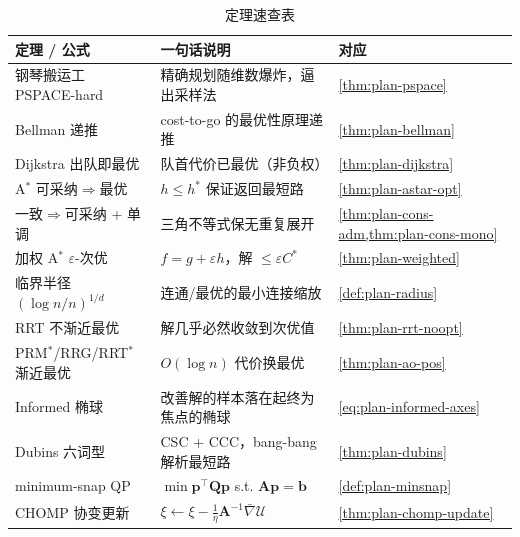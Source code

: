 \begin{table}[H]\centering\small
\caption{定理速查表}
\begin{tabular}{lll}
\toprule
定理 / 公式 & 一句话说明 & 对应 \\
\midrule
钢琴搬运工 PSPACE-hard & 精确规划随维数爆炸，逼出采样法 & \cref{thm:plan-pspace} \\
Bellman 递推 & cost-to-go 的最优性原理递推 & \cref{thm:plan-bellman} \\
Dijkstra 出队即最优 & 队首代价已最优（非负权） & \cref{thm:plan-dijkstra} \\
A$^*$ 可采纳$\Rightarrow$最优 & $h\le h^*$ 保证返回最短路 & \cref{thm:plan-astar-opt} \\
一致$\Rightarrow$可采纳 + 单调 & 三角不等式保无重复展开 & \cref{thm:plan-cons-adm,thm:plan-cons-mono} \\
加权 A$^*$ $\varepsilon$-次优 & $f=g+\varepsilon h$，解 $\le\varepsilon C^*$ & \cref{thm:plan-weighted} \\
临界半径 $(\log n/n)^{1/d}$ & 连通/最优的最小连接缩放 & \cref{def:plan-radius} \\
RRT 不渐近最优 & 解几乎必然收敛到次优值 & \cref{thm:plan-rrt-noopt} \\
PRM$^*$/RRG/RRT$^*$ 渐近最优 & $O(\log n)$ 代价换最优 & \cref{thm:plan-ao-pos} \\
Informed 椭球 & 改善解的样本落在起终为焦点的椭球 & \cref{eq:plan-informed-axes} \\
Dubins 六词型 & CSC + CCC，bang-bang 解析最短路 & \cref{thm:plan-dubins} \\
minimum-snap QP & $\min\mathbf{p}^\top\mathbf{Q}\mathbf{p}$ s.t. $\mathbf{A}\mathbf{p}=\mathbf{b}$ & \cref{def:plan-minsnap} \\
CHOMP 协变更新 & $\xi\leftarrow\xi-\tfrac1\eta\mathbf{A}^{-1}\bar\nabla\mathcal{U}$ & \cref{thm:plan-chomp-update} \\
\bottomrule
\end{tabular}
\end{table}

